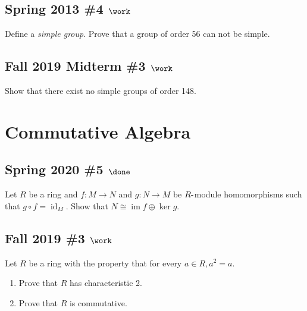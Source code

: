 \hypertarget{spring-2013-4-work}{%
\subsection{\texorpdfstring{Spring 2013 \#4
\(\work\)}{Spring 2013 \#4 \textbackslash work}}\label{spring-2013-4-work}}

Define a \emph{simple group}. Prove that a group of order 56 can not be
simple.

\hypertarget{fall-2019-midterm-3-work}{%
\subsection{\texorpdfstring{Fall 2019 Midterm \#3
\(\work\)}{Fall 2019 Midterm \#3 \textbackslash work}}\label{fall-2019-midterm-3-work}}

Show that there exist no simple groups of order 148.

\hypertarget{commutative-algebra}{%
\section{Commutative Algebra}\label{commutative-algebra}}

\hypertarget{spring-2020-5-done}{%
\subsection{\texorpdfstring{Spring 2020 \#5
\(\done\)}{Spring 2020 \#5 \textbackslash done}}\label{spring-2020-5-done}}

Let \(R\) be a ring and \(f: M\to N\) and \(g: N\to M\) be
\(R{\hbox{-}}\)module homomorphisms such that
\(g\circ f = \operatorname{id}_M\). Show that
\(N \cong \operatorname{im}f \oplus \ker g\).

\hypertarget{fall-2019-3-work}{%
\subsection{\texorpdfstring{Fall 2019 \#3
\(\work\)}{Fall 2019 \#3 \textbackslash work}}\label{fall-2019-3-work}}

Let \(R\) be a ring with the property that for every
\(a \in R, a^2 = a\).

\begin{enumerate}
\def\labelenumi{\alph{enumi}.}
\item
  Prove that \(R\) has characteristic 2.
\item
  Prove that \(R\) is commutative.
\end{enumerate}

